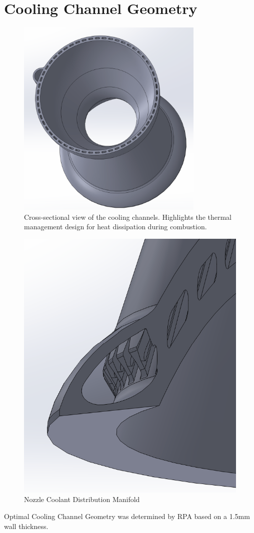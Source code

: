 \section{Cooling Channel Geometry}
\begin{figure}[H]
    \centering
    \includegraphics[width=0.8\textwidth]{Images/CrossSectChannel.png}
    \caption{Cross-sectional view of the cooling channels. Highlights the thermal management design for heat dissipation during combustion.}
    \label{fig:cooling_channels}
\end{figure}

\begin{figure}
    \centering
    \includegraphics[width=0.75\linewidth]{Images/coolmanifold.png}
    \caption{Nozzle Coolant Distribution Manifold}
    \label{fig:enter-label}
\end{figure}
Optimal Cooling Channel Geometry was determined by RPA based on a 1.5mm wall thickness. 


